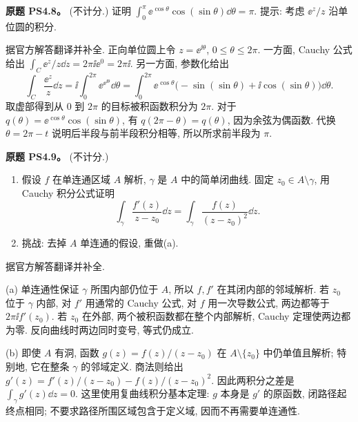 \begin{exercise}\label{ass:ps4-8}
\textbf{原题 PS4.8。} (不计分.) 证明
$\int_0^\pi\ee^{\cos\theta}\cos(\sin\theta)\dd\theta=\pi$.
提示: 考虑 $\ee^z/z$ 沿单位圆的积分.
\end{exercise}
\begin{solution}
据官方解答翻译并补全. 正向单位圆上令 $z=\ee^{\ii\theta}$, $0\le\theta\le2\pi$.
一方面, Cauchy 公式给出 $\int_C\ee^z/z\dd z=2\pi\ii\ee^0=2\pi\ii$.
另一方面, 参数化给出
\[
 \int_C\frac{\ee^z}{z}\dd z
 =\ii\int_0^{2\pi}\ee^{\ee^{\ii\theta}}\dd\theta
 =\int_0^{2\pi}\ee^{\cos\theta}
 \bigl(-\sin(\sin\theta)+\ii\cos(\sin\theta)\bigr)\dd\theta.
\]
取虚部得到从 $0$ 到 $2\pi$ 的目标被积函数积分为 $2\pi$.
对于 $q(\theta)=\ee^{\cos\theta}\cos(\sin\theta)$,
有 $q(2\pi-\theta)=q(\theta)$, 因为余弦为偶函数. 代换
$\theta=2\pi-t$ 说明后半段与前半段积分相等, 所以所求前半段为 $\pi$.
\end{solution}

\begin{exercise}\label{ass:ps4-9}
\textbf{原题 PS4.9。} (不计分.)
\begin{enumerate}[label=(\alph*)]
\item 假设 $f$ 在单连通区域 $A$ 解析, $\gamma$ 是 $A$ 中的简单闭曲线.
固定 $z_0\in A\setminus\gamma$, 用 Cauchy 积分公式证明
\[
 \int_\gamma\frac{f'(z)}{z-z_0}\dd z
 =\int_\gamma\frac{f(z)}{(z-z_0)^2}\dd z.
\]
\item 挑战: 去掉 $A$ 单连通的假设, 重做(a).
\end{enumerate}
\end{exercise}
\begin{solution}
据官方解答翻译并补全.

(a) 单连通性保证 $\gamma$ 所围内部仍位于 $A$, 所以 $f,f'$ 在其闭内部的邻域解析.
若 $z_0$ 位于 $\gamma$ 内部, 对 $f'$ 用通常的 Cauchy 公式, 对 $f$ 用一次导数公式, 两边都等于 $2\pi\ii f'(z_0)$.
若 $z_0$ 在外部, 两个被积函数都在整个内部解析, Cauchy 定理使两边都为零.
反向曲线时两边同时变号, 等式仍成立.

(b) 即使 $A$ 有洞, 函数 $g(z)=f(z)/(z-z_0)$ 在 $A\setminus\{z_0\}$ 中仍单值且解析; 特别地, 它在整条 $\gamma$ 的邻域定义.
商法则给出
$g'(z)=f'(z)/(z-z_0)-f(z)/(z-z_0)^2$.
因此两积分之差是 $\int_\gamma g'(z)\dd z=0$.
这里使用复曲线积分基本定理: $g$ 本身是 $g'$ 的原函数, 闭路径起终点相同; 不要求路径所围区域包含于定义域, 因而不再需要单连通性.
\end{solution}


